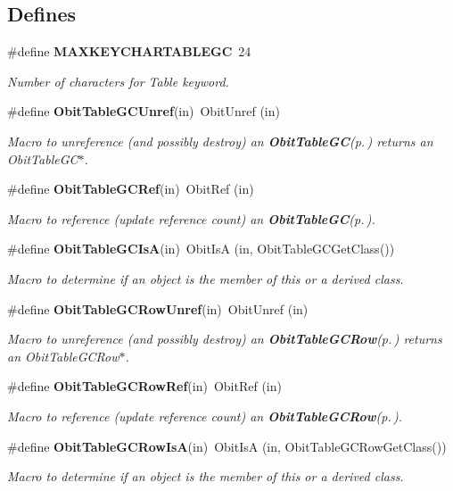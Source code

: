 \subsection*{Defines}
\begin{CompactItemize}
\item 
\#define {\bf MAXKEYCHARTABLEGC}\ 24
\begin{CompactList}\small\item\em Number of characters for Table keyword. \item\end{CompactList}\item 
\#define {\bf Obit\-Table\-GCUnref}(in)\ Obit\-Unref (in)
\begin{CompactList}\small\item\em Macro to unreference (and possibly destroy) an {\bf Obit\-Table\-GC}{\rm (p.\,\pageref{structObitTableGC})} returns an Obit\-Table\-GC$\ast$. \item\end{CompactList}\item 
\#define {\bf Obit\-Table\-GCRef}(in)\ Obit\-Ref (in)
\begin{CompactList}\small\item\em Macro to reference (update reference count) an {\bf Obit\-Table\-GC}{\rm (p.\,\pageref{structObitTableGC})}. \item\end{CompactList}\item 
\#define {\bf Obit\-Table\-GCIs\-A}(in)\ Obit\-Is\-A (in, Obit\-Table\-GCGet\-Class())
\begin{CompactList}\small\item\em Macro to determine if an object is the member of this or a derived class. \item\end{CompactList}\item 
\#define {\bf Obit\-Table\-GCRow\-Unref}(in)\ Obit\-Unref (in)
\begin{CompactList}\small\item\em Macro to unreference (and possibly destroy) an {\bf Obit\-Table\-GCRow}{\rm (p.\,\pageref{structObitTableGCRow})} returns an Obit\-Table\-GCRow$\ast$. \item\end{CompactList}\item 
\#define {\bf Obit\-Table\-GCRow\-Ref}(in)\ Obit\-Ref (in)
\begin{CompactList}\small\item\em Macro to reference (update reference count) an {\bf Obit\-Table\-GCRow}{\rm (p.\,\pageref{structObitTableGCRow})}. \item\end{CompactList}\item 
\#define {\bf Obit\-Table\-GCRow\-Is\-A}(in)\ Obit\-Is\-A (in, Obit\-Table\-GCRow\-Get\-Class())
\begin{CompactList}\small\item\em Macro to determine if an object is the member of this or a derived class. \item\end{CompactList}\end{CompactItemize}
